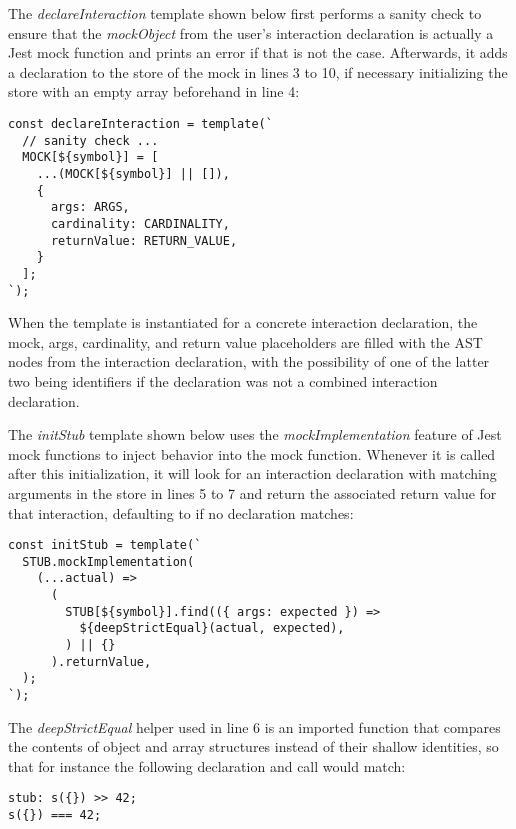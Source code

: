 The \textit{declareInteraction} template shown below first
performs a sanity check to ensure that
the \textit{mockObject} from the user's interaction declaration
is actually a Jest mock function and
prints an error if that is not the case.
Afterwards, it adds a declaration to the store of the mock in lines 3 to 10,
if necessary initializing the store with an empty array beforehand in line 4:
\begin{verbatim}
const declareInteraction = template(`
  // sanity check ...
  MOCK[${symbol}] = [
    ...(MOCK[${symbol}] || []),
    {
      args: ARGS,
      cardinality: CARDINALITY,
      returnValue: RETURN_VALUE,
    }
  ];
`);
\end{verbatim}
When the template is instantiated for a concrete interaction declaration,
the mock, args, cardinality, and return value placeholders
are filled with the AST nodes from the interaction declaration,
with the possibility of one of the latter two being  identifiers
if the declaration was not a combined interaction declaration.

The \textit{initStub} template shown below uses
the \textit{mockImplementation} feature of Jest mock functions
to inject behavior into the mock function.
Whenever it is called after this initialization,
it will look for an interaction declaration
with matching arguments in the store in lines 5 to 7
and return the associated return value for that interaction,
defaulting to  if no declaration matches:
\begin{verbatim}
const initStub = template(`
  STUB.mockImplementation(
    (...actual) =>
      (
        STUB[${symbol}].find(({ args: expected }) =>
          ${deepStrictEqual}(actual, expected),
        ) || {}
      ).returnValue,
  );
`);
\end{verbatim}
The \textit{deepStrictEqual} helper used in line 6 is an imported function
that compares the contents of object and array structures
instead of their shallow identities,
so that for instance the following declaration and call would match:
\begin{verbatim}
stub: s({}) >> 42;
s({}) === 42;
\end{verbatim}

